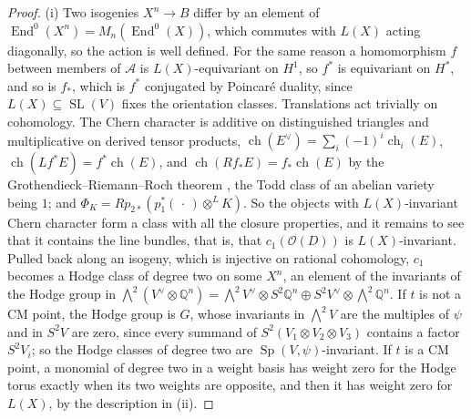 \documentclass[11pt,reqno]{amsart}
\theoremstyle{plain}
\theoremstyle{definition}
\theoremstyle{remark}
\newcommand{\QQ}{\mathbb{Q}}
\DeclareMathOperator{\ch}{ch}
\DeclareMathOperator{\End}{End}
\DeclareMathOperator{\SL}{SL}
\DeclareMathOperator{\Sp}{Sp}
\begin{document}
\begin{proof}
(i) Two isogenies $X^{n}\to B$ differ by an element of $\End^{0}(X^{n})=
M_{n}(\End^{0}(X))$, which commutes with $L(X)$ acting diagonally, so the
action is well defined. For the same reason a homomorphism $f$ between members
of $\mathcal{A}$ is $L(X)$-equivariant on $H^{1}$, so $f^{*}$ is equivariant
on $H^{*}$, and so is $f_{*}$, which is $f^{*}$ conjugated by Poincar\'e
duality, since $L(X)\subseteq\SL(V)$ fixes the orientation classes.
Translations act trivially on cohomology. The Chern character is additive on
distinguished triangles and multiplicative on derived tensor products,
$\ch(E^{\vee})=\sum_{i}(-1)^{i}\ch_{i}(E)$, $\ch(Lf^{*}E)=f^{*}\ch(E)$, and
$\ch(Rf_{*}E)=f_{*}\ch(E)$ by the Grothendieck--Riemann--Roch theorem
\cite[Theorem~15.2]{Ful98}, the Todd class of an abelian variety being $1$;
and $\Phi_{K}=Rp_{2*}(p_{1}^{*}(\,\cdot\,)\otimes^{L}K)$. So the objects with
$L(X)$-invariant Chern character form a class with all the closure
properties, and it remains to see that it contains the line bundles, that is,
that $c_{1}(\mathcal{O}(D))$ is $L(X)$-invariant. Pulled back along an
isogeny, which is injective on rational cohomology, $c_{1}$ becomes a Hodge
class of degree two on some $X^{n}$, an element of the invariants of the
Hodge group in ${\textstyle\bigwedge^{2}}(V^{\vee}\otimes\QQ^{n})=
{\textstyle\bigwedge^{2}}V^{\vee}\otimes S^{2}\QQ^{n}\oplus S^{2}V^{\vee}
\otimes{\textstyle\bigwedge^{2}}\QQ^{n}$. If $t$ is not a CM point, the Hodge
group is $G$, whose invariants in ${\textstyle\bigwedge^{2}}V$ are the multiples of $\psi$
and in $S^{2}V$ are zero, since every summand of $S^{2}(V_{1}\otimes V_{2}
\otimes V_{3})$ contains a factor $S^{2}V_{i}$; so the Hodge classes of degree
two are $\Sp(V,\psi)$-invariant. If $t$ is a CM point, a monomial of degree two
in a weight basis has weight zero for the Hodge torus exactly when its two
weights are opposite, and then it has weight zero for $L(X)$, by the
description in (ii).


\end{proof}
\end{document}
